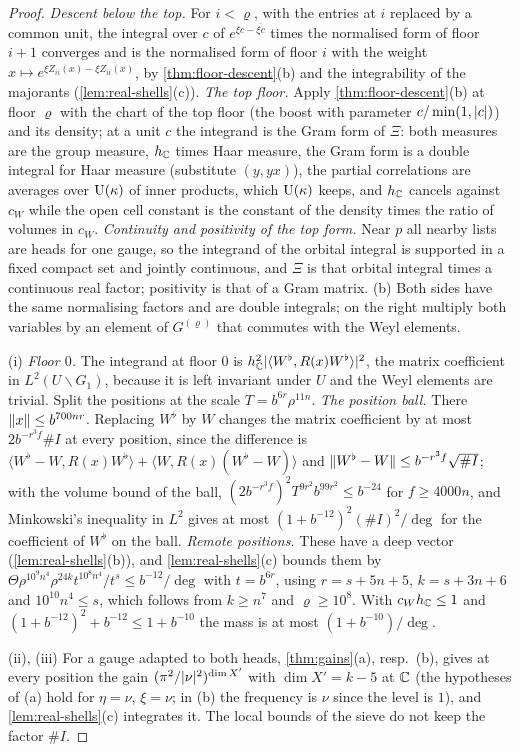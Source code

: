 \begin{proof}
\emph{Descent below the top.} For $i<\varrho$, with the entries at $i$ replaced by a common unit, the integral over $c$ of $e^{\xi c-\overline{\xi c}}$ times the normalised form of floor $i+1$ converges and is the normalised form of floor $i$ with the
weight $x\mapsto e^{\xi Z_{ii}(x)-\overline{\xi Z_{ii}(x)}}$, by \cref{thm:floor-descent}(b) and the integrability of the majorants (\cref{lem:real-shells}(c)). \emph{The top floor.} Apply \cref{thm:floor-descent}(b) at floor $\varrho$ with the chart of the
top floor (the boost with parameter $c/\min(1,\lvert c\rvert)$) and its density; at a unit $c$ the integrand is the Gram form of $\Xi$: both measures are the group measure, $h_{\mathbb{C}}$ times Haar measure, the Gram form is a double integral for
Haar measure (substitute $(y,yx)$), the partial correlations are averages over $\operatorname{U}(\kappa)$ of inner products, which $\operatorname{U}(\kappa)$ keeps, and $h_{\mathbb{C}}$ cancels against $c_W$ while the open cell constant is the constant of the density times the
ratio of volumes in $c_W$. \emph{Continuity and positivity of the top form.} Near $p$ all nearby lists are heads for one gauge, so the integrand of the orbital integral is supported in a fixed compact set and jointly continuous, and
$\Xi$ is that orbital integral times a continuous real factor; positivity is that of a Gram matrix. (b) Both sides have the same normalising factors and are double integrals; on the right multiply both variables by an element of
$G^{(\varrho)}$ that commutes with the Weyl elements.

(i) \emph{Floor $0$.} The integrand at floor $0$ is $h_{\mathbb{C}}^2\lvert \langle W^\flat,R(x)W^\flat\rangle\rvert^2$, the matrix coefficient in $L^2(U\backslash G_1)$, because it is left invariant under $U$ and the Weyl elements are trivial. Split the positions at the scale
$T=b^{6r}\rho^{11n}$. \emph{The position ball.} There $\lVert x\rVert\le b^{700nr}$. Replacing $W^\flat$ by $W$ changes the matrix coefficient by at most $2b^{-r^3f}\#I$ at every position, since the difference is
$\langle W^\flat-W,R(x)W^\flat\rangle+\langle W,R(x)(W^\flat-W)\rangle$ and $\lVert W^\flat-W\rVert\le b^{-r^3f}\sqrt{\#I}$; with the volume bound of the ball, $(2b^{-r^3f})^2T^{9r^2}b^{99r^2}\le b^{-24}$ for $f\ge4000n$, and Minkowski's inequality in
$L^2$ gives at most $(1+b^{-12})^2(\#I)^2/\deg$ for the coefficient of $W^\flat$ on the ball. \emph{Remote positions.} These have a deep vector (\cref{lem:real-shells}(b)), and \cref{lem:real-shells}(c) bounds them by
$\Theta\rho^{10^9n^4}\rho^{24k}t^{10^8n^4}/t^s\le b^{-12}/\deg$ with $t=b^{6r}$, using $r=s+5n+5$, $k=s+3n+6$ and $10^{10}n^4\le s$, which follows from $k\ge n^7$ and $\varrho\ge10^8$. With $c_Wh_{\mathbb{C}}\le1$ and $(1+b^{-12})^2+b^{-12}\le1+b^{-10}$ the mass is at most $(1+b^{-10})/\deg$.

(ii), (iii) For a gauge adapted to both heads, \cref{thm:gains}(a), resp.\ (b), gives at every position the gain $(\pi^2/\lvert \nu\rvert^2)^{\dim X'}$ with $\dim X'=k-5$ at $\mathbb{C}$ (the hypotheses of (a) hold for $\eta=\nu$, $\xi=\nu$; in (b) the frequency is
$\nu$ since the level is $1$), and \cref{lem:real-shells}(c) integrates it. The local bounds of the sieve do not keep the factor $\#I$.
\end{proof}

